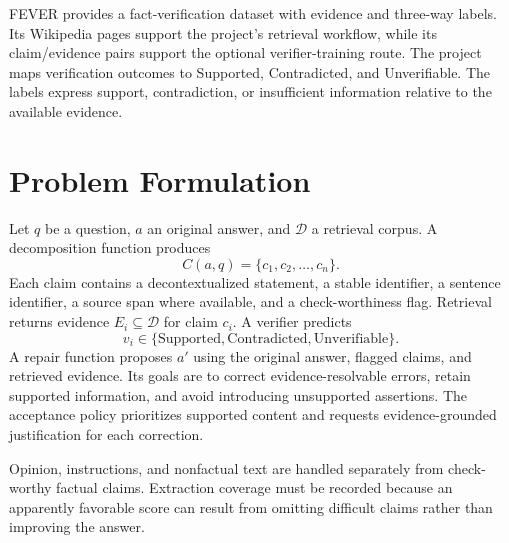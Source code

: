 \documentclass[11pt,a4paper]{article}
\begin{document}
FEVER provides a fact-verification dataset with evidence and three-way labels. Its Wikipedia pages support the project's retrieval workflow, while its claim/evidence pairs support the optional verifier-training route. The project maps verification outcomes to Supported, Contradicted, and Unverifiable. The labels express support, contradiction, or insufficient information relative to the available evidence.

\section{Problem Formulation}
Let $q$ be a question, $a$ an original answer, and $\mathcal{D}$ a retrieval corpus. A decomposition function produces
\[
 C(a,q)=\{c_1,c_2,\ldots,c_n\}.
\]
Each claim contains a decontextualized statement, a stable identifier, a sentence identifier, a source span where available, and a check-worthiness flag. Retrieval returns evidence $E_i\subseteq\mathcal{D}$ for claim $c_i$. A verifier predicts
\[
 v_i\in\{\mathrm{Supported},\mathrm{Contradicted},\mathrm{Unverifiable}\}.
\]
A repair function proposes $a'$ using the original answer, flagged claims, and retrieved evidence. Its goals are to correct evidence-resolvable errors, retain supported information, and avoid introducing unsupported assertions. The acceptance policy prioritizes supported content and requests evidence-grounded justification for each correction.

Opinion, instructions, and nonfactual text are handled separately from check-worthy factual claims. Extraction coverage must be recorded because an apparently favorable score can result from omitting difficult claims rather than improving the answer.
\end{document}
